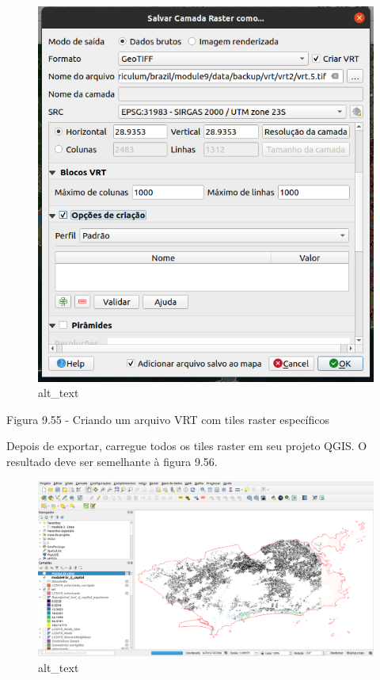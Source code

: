 \documentclass[
]{book}
\begin{document}
\begin{figure}
\centering
\includegraphics{media/modulo9/fig955.png}
\caption{alt\_text}
\end{figure}

Figura 9.55 - Criando um arquivo VRT com tiles raster específicos

Depois de exportar, carregue todos os tiles raster em seu projeto QGIS. O resultado deve ser semelhante à figura 9.56.

\begin{figure}
\centering
\includegraphics{media/modulo9/fig956.png}
\caption{alt\_text}
\end{figure}
\end{document}
